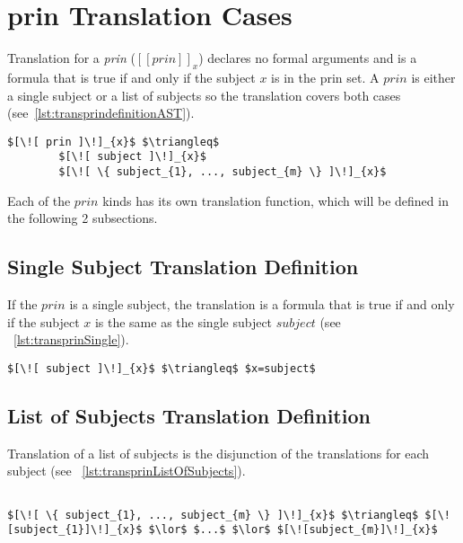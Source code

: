 \section{prin Translation Cases}
Translation for a \emph{prin} ($[\![ prin ]\!]_{x}$) declares no formal arguments and is a formula that is true if and only if the subject $x$ is in the prin set. A $prin$ is either a single subject or a list of subjects so the translation covers both cases (see~\ref{lst:transprindefinitionAST}).

\lstset{mathescape, language=AST}  
\begin{lstlisting}[frame=single, caption={Prin Translation Cases},label={lst:transprindefinitionAST}]
$[\![ prin ]\!]_{x}$ $\triangleq$ 
        $[\![ subject ]\!]_{x}$
        $[\![ \{ subject_{1}, ..., subject_{m} \} ]\!]_{x}$
\end{lstlisting}

Each of the $prin$ kinds has its own translation function, which will be defined in the following 2 subsections.



\subsection{Single Subject Translation Definition}
If the $prin$ is a single subject, the translation is a formula that is true if and only if the subject $x$ is the same as the single subject $subject$ (see ~\ref{lst:transprinSingle}).

\lstset{mathescape, language=AST}  
\begin{lstlisting}[frame=single, caption={Prin Translation Definition {$\colon$} Single subject},label={lst:transprinSingle}]
$[\![ subject ]\!]_{x}$ $\triangleq$ $x=subject$
\end{lstlisting}

\subsection{List of Subjects Translation Definition}
Translation of a list of subjects is the disjunction of the translations for each subject (see ~\ref{lst:transprinListOfSubjects}).

\lstset{mathescape, language=AST}  
\begin{lstlisting}[frame=single, caption={Prin Translation Definition {$\colon$} List of subjects},label={lst:transprinListOfSubjects}]

$[\![ \{ subject_{1}, ..., subject_{m} \} ]\!]_{x}$ $\triangleq$ $[\![subject_{1}]\!]_{x}$ $\lor$ $...$ $\lor$ $[\![subject_{m}]\!]_{x}$

\end{lstlisting}

